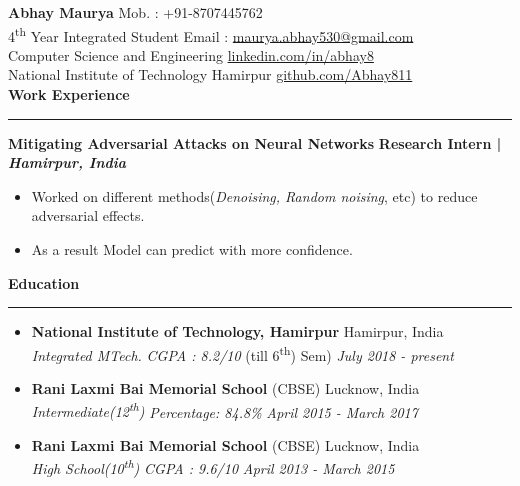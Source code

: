 \documentclass[11pt]{article}
\begin{document}
   
    \textbf{\LARGE{Abhay Maurya}}
    \hfill
        Mob. : +91-8707445762
    \\
    4\textsuperscript{th} Year Integrated Student
    \hfill
        Email : \href{mailto:maurya.08abhay@gmail.com}{\color{blue}maurya.abhay530@gmail.com}\\
    \hfill
        Computer Science and Engineering
    \hfill
        \href{https://www.linkedin.com/in/abhay8/}{\color{blue}linkedin.com/in/abhay8}\\
    \hfill
    National Institute of Technology Hamirpur
    \hfill
     \href{https://github.com/Abhay811}{\color{blue}github.com/Abhay811}\\

 \textbf{\large{Work Experience}}
    \vspace{3pt}
    \hrule
    \vspace{6pt}
    \hspace{8pt}\textbf{Mitigating Adversarial Attacks on Neural Networks}
    \hfill
    \textbf{Research Intern | \textit{Hamirpur, India}}
    \begin{itemize}
        \setlength{\itemsep}{0pt}
        \setlength{\parskip}{0pt}
        \setlength{\parsep}{0pt}
        \item Worked on different methods(\textit{Denoising, Random noising}, etc) to reduce adversarial effects.
        \item As a result Model can predict with more confidence.
    \end{itemize}

\textbf{\large{Education}}
    \vspace{3pt}
   \hrule
    \begin{itemize}
    \setlength{\itemsep}{4pt}
        \setlength{\parskip}{0pt}
        \setlength{\parsep}{4pt}
        \item \textbf{National Institute of Technology, Hamirpur} \hfill Hamirpur, India\\
        \textsl{Integrated MTech.} \textit{CGPA : 8.2/10}  (till 6\textsuperscript{th}) Sem)
        \hfill 
        \textit{July 2018 - present}
        \item \textbf{Rani Laxmi Bai Memorial School} (CBSE) \hfill Lucknow, India\\
        \textsl{Intermediate(12\textsuperscript{th}) } \textit{Percentage: 84.8\%}  \hfill 
        \textit{April 2015 - March 2017}
        \item \textbf{Rani Laxmi Bai Memorial School} (CBSE) \hfill
        Lucknow, India\\
        \textsl{High School(10\textsuperscript{th})} \textit{CGPA : 9.6/10}
        \hfill \textit{April 2013 - March 2015}
    \end{itemize}
    
\end{document}
